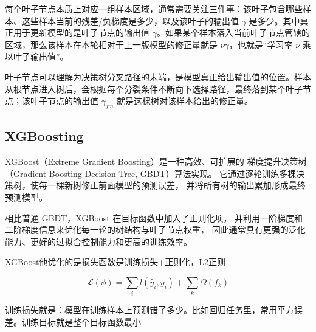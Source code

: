 \begin{dxtips}
    每个叶子节点本质上对应一组样本区域，通常需要关注三件事：该叶子包含哪些样本、这些样本当前的残差/负梯度是多少，以及该叶子的输出值 $\gamma$ 是多少。其中真正用于更新模型的是叶子节点的输出值 $\gamma$。如果某个样本落入当前叶子节点管辖的区域，那么该样本在本轮相对于上一版模型的修正量就是 $\nu\gamma$，也就是“学习率 $\nu$ 乘以叶子输出值”。
\end{dxtips}
\begin{dxtips}
    叶子节点可以理解为决策树分叉路径的末端，是模型真正给出输出值的位置。样本从根节点进入树后，会根据每个分裂条件不断向下选择路径，最终落到某个叶子节点；该叶子节点的输出值 $\gamma_{jm}$ 就是这棵树对该样本给出的修正量。
\end{dxtips}
\subsection{XGBoosting}
\begin{definition}[XGBoost]
XGBoost（Extreme Gradient Boosting）是一种高效、可扩展的
梯度提升决策树（Gradient Boosting Decision Tree, GBDT）算法实现。
它通过逐轮训练多棵决策树，使每一棵新树修正前面模型的预测误差，
并将所有树的输出累加形成最终预测模型。

相比普通 GBDT，XGBoost 在目标函数中加入了正则化项，
并利用一阶梯度和二阶梯度信息来优化每一轮的树结构与叶子节点权重，
因此通常具有更强的泛化能力、更好的过拟合控制能力和更高的训练效率。
\end{definition}
\begin{dxtips}
    XGBoost他优化的是损失函数是训练损失+正则化，L2正则
\end{dxtips}
\begin{note}[优化函数]
    \[
\mathcal{L}(\phi)
=
\sum_i l(\hat{y}_i,y_i)
+
\sum_k \Omega(f_k)
\]
\end{note}
\begin{dxtips}
训练损失就是：模型在训练样本上预测错了多少。比如回归任务里，常用平方误差。训练目标就是整个目标函数最小
\end{dxtips}

